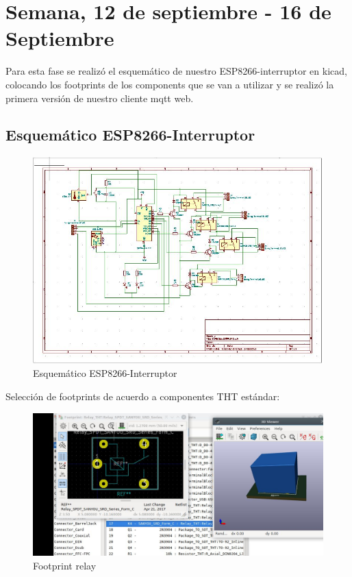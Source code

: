 \documentclass[oneside]{article}
\begin{document}
\newpage
\section*{Semana, 12 de septiembre - 16 de Septiembre}
Para esta fase se realizó el esquemático de nuestro ESP8266-interruptor en kicad, colocando los footprints de los components que se van a utilizar y se realizó la primera versión de nuestro cliente mqtt web.
\subsection*{Esquemático ESP8266-Interruptor}
\begin{figure}[H]
\centering
\includegraphics[scale=0.9]{images/esquematico.jpg}
\caption{Esquemático ESP8266-Interruptor}
\end{figure}

Selección de footprints de acuerdo a componentes THT estándar:
\begin{figure}[H]
\centering
\includegraphics[scale=0.5]{images/footprint1.jpg}
\caption{Footprint relay}
\end{figure}
\end{document}
